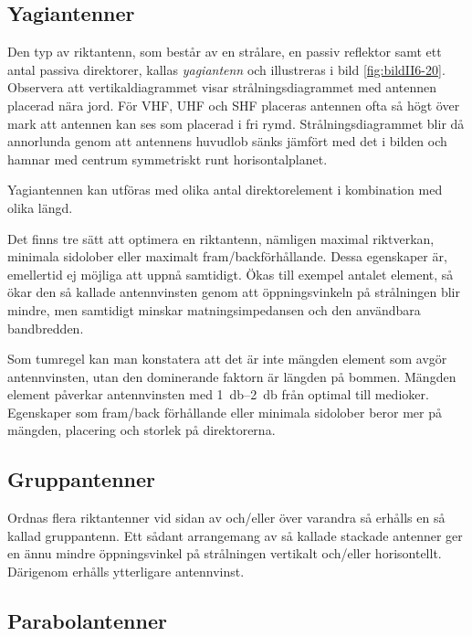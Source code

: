 \subsection{Yagiantenner}
\label{antenner_vhf_yagi}


Den typ av riktantenn, som består av en strålare, en passiv reflektor
samt ett antal passiva direktorer, kallas \emph{yagiantenn} och illustreras i
bild \ref{fig:bildII6-20}.
Observera att vertikaldiagrammet visar strålningsdiagrammet med antennen
placerad nära jord.
För VHF, UHF och SHF placeras antennen ofta så högt över mark att antennen kan
ses som placerad i fri rymd.
Strålningsdiagrammet blir då annorlunda genom att antennens huvudlob sänks jämfört
med det i bilden och hamnar med centrum symmetriskt runt horisontalplanet.

Yagiantennen kan utföras med olika antal direktorelement i kombination med
olika längd.

Det finns tre sätt att optimera en riktantenn, nämligen maximal
riktverkan, minimala sidolober eller maximalt fram/backförhållande.
Dessa egenskaper är, emellertid ej möjliga att uppnå samtidigt.
Ökas till exempel antalet element, så ökar den så kallade antennvinsten genom
att öppningsvinkeln på strålningen blir mindre, men samtidigt minskar
matningsimpedansen och den användbara bandbredden.

Som tumregel kan man konstatera att det är inte mängden element som
avgör antennvinsten, utan den dominerande faktorn är längden på bommen.
Mängden element påverkar antennvinsten med \SIrange{1}{2}{\decibel} från optimal
till medioker.
Egenskaper som fram/back förhållande eller minimala sidolober beror mer
på mängden, placering och storlek på direktorerna.

\subsection{Gruppantenner}

Ordnas flera riktantenner vid sidan av och/eller över varandra så
erhålls en så kallad gruppantenn.
Ett sådant arrangemang av så kallade stackade antenner ger en ännu mindre
öppningsvinkel på strålningen vertikalt och/eller horisontellt.
Därigenom erhålls ytterligare antennvinst.

\subsection{Parabolantenner}

